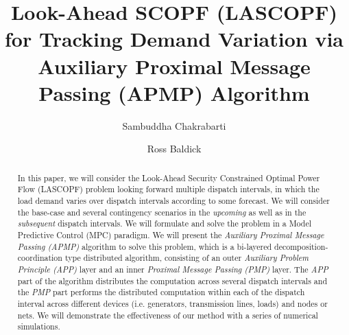 \documentclass[preprint,12pt,3p]{elsarticle}
\begin{document}
\begin{frontmatter}
\title{Look-Ahead SCOPF (LASCOPF) for Tracking Demand Variation via Auxiliary Proximal Message Passing (APMP) Algorithm
}
\author[label1]{Sambuddha Chakrabarti}
\address[label1]{Division of Automatic Controls (Reglerteknik/RT), Department of Electrical Engineering (Institutionen f\"{o}r Systemteknik/ISY),
        Link\"{o}pings Universitet, Link\"{o}ping 58183, Sweden}
\author[label5]{Ross Baldick}
\address[label5]{Department of Electrical \& Computer Engineering (ECE), The University of Texas at Austin,
        Austin, TX 78705, USA}
\begin{abstract}
  In this paper, we will consider the Look-Ahead Security Constrained Optimal Power Flow (LASCOPF) problem looking forward multiple dispatch intervals, in which the load demand varies over dispatch intervals according to some forecast. We will consider the base-case and several contingency scenarios in the \emph{upcoming} as well as in the \emph{subsequent} dispatch intervals. We will formulate and solve the problem in a Model Predictive Control (MPC) paradigm. We will present the \emph{Auxiliary Proximal Message Passing (APMP)} algorithm to solve this problem, which is a bi-layered decomposition-coordination type distributed algorithm, consisting of an outer \emph{Auxiliary Problem Principle (APP)} layer and an inner \emph{Proximal Message Passing (PMP)} layer. The \emph{APP} part of the algorithm distributes the computation across several dispatch intervals and the \emph{PMP} part performs the distributed computation within each of the dispatch interval across different devices (i.e. generators, transmission lines, loads) and nodes or nets. We will demonstrate the effectiveness of our method with a series of numerical simulations.\\  
\end{abstract}
\end{frontmatter}
\end{document}

